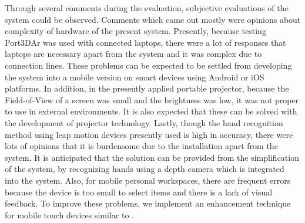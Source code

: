Through several comments during the evaluation, subjective evaluations of the system could be observed. Comments which came out mostly were opinions about complexity of hardware of the present system. Presently, because testing Port3DAr was used with connected laptops, there were a lot of responses that laptops are necessary apart from the system and it was complex due to connection lines. These problems can be expected to be settled from developing the system into a mobile version on smart devices using Android or iOS platforms. 
In addition, in the presently applied portable projector, because the Field-of-View of a screen was small and the brightness was low, it was not proper to use in external environments. It is also expected that these can be solved with the development of projector technology. Lastly, though the hand recognition method using leap motion devices presently used is high in accuracy, there were lots of opinions that it is burdensome due to the installation apart from the system. It is anticipated that the solution can be provided from the simplification of the system, by recognizing hands using a depth camera which is integrated into the system.
Also, for mobile personal workspaces, there are frequent errors because the device is too small to select items and there is a lack of visual feedback. To improve these problems, we implement an enhancement technique for mobile touch devices similar to \cite{vogel_shift:_2007}.
